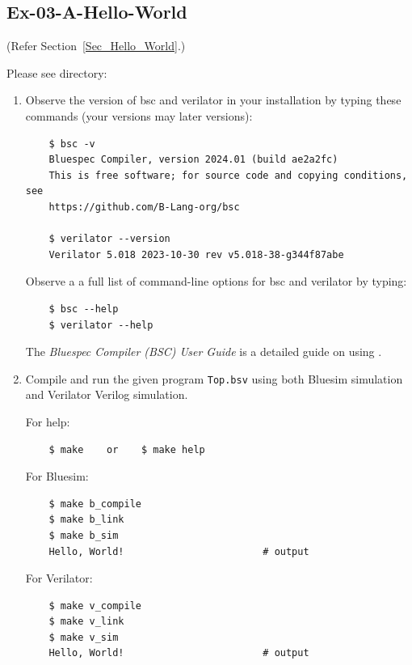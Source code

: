 
\subsection*{Ex-03-A-Hello-World}
\label{Ex-03-A-Hello-World}

(Refer Section~\ref{Sec_Hello_World}.)

Please see directory: 

\begin{enumerate}

  \item Observe the version of bsc and verilator in your installation
    by typing these commands (your versions may later versions):

    \begin{verbatim}
    $ bsc -v
    Bluespec Compiler, version 2024.01 (build ae2a2fc)
    This is free software; for source code and copying conditions, see
    https://github.com/B-Lang-org/bsc

    $ verilator --version
    Verilator 5.018 2023-10-30 rev v5.018-38-g344f87abe
    \end{verbatim}

    Observe a a full list of command-line options for bsc and verilator by typing:


    \begin{verbatim}
    $ bsc --help
    $ verilator --help
    \end{verbatim}

    The \emph{Bluespec Compiler (BSC) User Guide} is a detailed guide on using {\bsc}.

  \item Compile and run the given {\BSV} program \verb|Top.bsv| using both
    Bluesim simulation and Verilator Verilog simulation.

    For help:
    \begin{verbatim}
    $ make    or    $ make help
    \end{verbatim}

    For Bluesim:
    \begin{verbatim}
    $ make b_compile
    $ make b_link
    $ make b_sim
    Hello, World!                        # output
    \end{verbatim}

    For Verilator:
    \begin{verbatim}
    $ make v_compile
    $ make v_link
    $ make v_sim
    Hello, World!                        # output
    \end{verbatim}


\end{enumerate}
